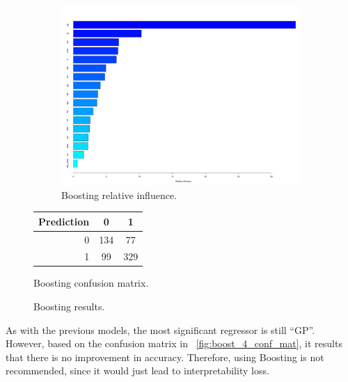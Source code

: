 \begin{figure}[H]
	\centering
	\begin{subfigure}{0.5\textwidth}
		\centering
		\includegraphics[width=0.6\linewidth]{ImageFiles/Classification/Trees/boost_4_rel_inf}
		\caption{Boosting relative influence.}
		\label{fig:boost_4_rel_inf}
	\end{subfigure}%
	\hfill
	\begin{subtable}[h]{0.5\textwidth}
		\centering
		\begin{tabular}{|| cr | cc ||}    
			\hline
			\multicolumn{2}{|c|}{Prediction} 
			& 0 & 1 \\
			\hline
			& 0 & 134 & 77 \\
			& 1 & 99 & 329 \\
			\hline
		\end{tabular}
		\caption{Boosting confusion matrix.}
		\label{table:ConfMaBoost}
	\end{subtable}
	\caption{Boosting results.}
	\label{BoostRes}
\end{figure}

As with the previous models, the most significant regressor is still ``GP''. However, based on the confusion matrix in \Fig~\ref{fig:boost_4_conf_mat}, it results that there is no improvement in accuracy. Therefore, using Boosting is not recommended, since it would just lead to interpretability loss.

